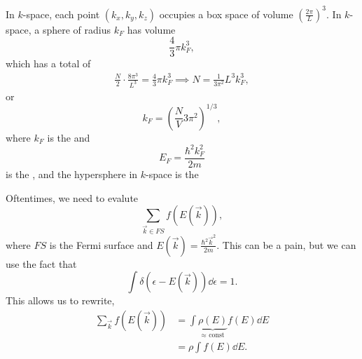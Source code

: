 \documentclass{article}
\numberwithin{equation}{section}
\begin{document}
In $k$-space, each point $(k_x,k_y,k_z)$ occupies a box space of volume $\left(\frac{2\pi}{L}\right)^3.$ In $k$-space, a sphere of radius $k_F$ has volume 
\begin{equation}
    \frac{4}{3}\pi k_F^3,
\end{equation}
which has a total of 
\begin{align}
    \frac{N}{2} \cdot \frac{8\pi^3}{L^3} = \frac{4}{3}\pi k_F^3 \implies N = \frac{1}{3\pi^2} L^3k_F^3,
\end{align}
or 
\begin{equation}
    k_F = \left(\frac{N}{V}3\pi^2\right)^{1/3},
\end{equation}
where $k_F$ is the  and
\begin{equation}
    E_F = \frac{\hbar^2k_F^2}{2m}
\end{equation}
is the , and the hypersphere in $k$-space is the 
\begin{idea}
    Oftentimes, we need to evalute 
    \begin{equation}
        \sum_{\vec{k} \in FS} f(E(\vec{k})),
    \end{equation}
    where $FS$ is the Fermi surface and $E(\vec{k}) = \frac{\hbar^2\vec{k}^2}{2m}.$ This can be a pain, but we can use the fact that 
    \begin{equation}
        \int \delta(\epsilon - E(\vec{k})) \dd{\epsilon} = 1.
    \end{equation}
    This allows us to rewrite,
    \begin{align}
        \sum_{\vec{k}}f(E(\vec{k})) &= \int \underbrace{\rho(E)}_{\approx \text{ const}} f(E) \dd{E} \\ 
        &= \rho \int f(E) \dd{E}.
    \end{align}
\end{idea}
\end{document}
